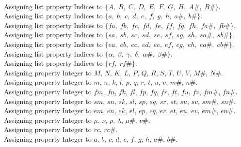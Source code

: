 \documentclass[11pt]{article}
\begin{document}
\\
Assigning list property Indices to $\{A,\; B,\; C,\; D,\; E,\; F,\; G,\; H,\; A\#,\; B\#\}$.
\\
Assigning list property Indices to $\{a,\; b,\; c,\; d,\; e,\; f,\; g,\; h,\; a\#,\; b\#\}$.
\\
Assigning list property Indices to $\{fa,\; fb,\; fc,\; fd,\; fe,\; ff,\; fg,\; fh,\; fa\#,\; fb\#\}$.
\\
Assigning list property Indices to $\{sa,\; sb,\; sc,\; sd,\; se,\; sf,\; sg,\; sh,\; sa\#,\; sb\#\}$.
\\
Assigning list property Indices to $\{ea,\; eb,\; ec,\; ed,\; ee,\; ef,\; eg,\; eh,\; ea\#,\; eb\#\}$.
\\
Assigning list property Indices to $\{\alpha,\; \beta,\; \gamma,\; \delta,\; \alpha\#,\; \beta\#\}$.
\\
Assigning list property Indices to $\{rf,\; rf\#\}$.
\\
Assigning property Integer to $M$, $N$, $K$, $L$, $P$, $Q$, $R$, $S$, $T$, $U$, $V$, $M\#$, $N\#$.
\\
Assigning property Integer to $m$, $n$, $k$, $l$, $p$, $q$, $r$, $t$, $u$, $v$, $m\#$, $n\#$.
\\
Assigning property Integer to $fm$, $fn$, $fk$, $fl$, $fp$, $fq$, $fr$, $ft$, $fu$, $fv$, $fm\#$, $fn\#$.
\\
Assigning property Integer to $sm$, $sn$, $sk$, $sl$, $sp$, $sq$, $sr$, $st$, $su$, $sv$, $sm\#$, $sn\#$.
\\
Assigning property Integer to $em$, $en$, $ek$, $el$, $ep$, $eq$, $er$, $et$, $eu$, $ev$, $em\#$, $en\#$.
\\
Assigning property Integer to $\mu$, $\nu$, $\rho$, $\lambda$, $\mu\#$, $\nu\#$.
\\
Assigning property Integer to $rc$, $rc\#$.
\\
Assigning property Integer to $a$, $b$, $c$, $d$, $e$, $f$, $g$, $h$, $a\#$, $b\#$.
\\
\end{document}
